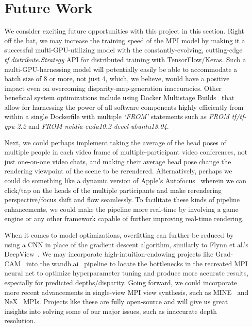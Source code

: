 \section{Future Work}\label{sec:future-work}

We consider exciting future opportunities with this project in this section. Right off the bat, we may increase the training speed of the MPI model by making it a successful multi-GPU-utilizing model with the constantly-evolving, cutting-edge \textit{tf.distribute.Strategy} API for distributed training with TensorFlow/Keras. Such a multi-GPU-harnessing model will potentially easily be able to accommodate a batch size of 8 or more, not just 4, which, we believe, would have a positive impact even on overcoming disparity-map-generation inaccuracies. Other beneficial system optimizations include using Docker Multistage Builds~\cite{noauthor_advanced_2020} that allow for harnessing the power of all software components highly efficiently from within a single Dockerfile with multiple \textit{`FROM'} statements such as \textit{FROM tf/tf-gpu-2.2} and \textit{FROM nvidia-cuda10.2-devel-ubuntu18.04}.

Next, we could perhaps implement taking the average of the head poses of multiple people in each video frame of multiple-participant video conferences, not just one-on-one video chats, and making their average head pose change the rendering viewpoint of the scene to be rerendered. Alternatively, perhaps we could do something like a dynamic version of Apple's Autofocus~\cite{noauthor_avcapturedevicefocusmodeautofocus_nodate} wherein we can click/tap on the heads of the multiple participants and make rerendering perspective/focus shift and flow seamlessly. To facilitate these kinds of pipeline enhancements, we could make the pipeline more real-time by involving a game engine or any other framework capable of further improving real-time rendering.

When it comes to model optimizations, overfitting can further be reduced by using a CNN in place of the gradient descent algorithm, similarly to Flynn et al.'s DeepView~\cite{flynn_deepview_2019}. We may incorporate high-intuition-endowing projects like Grad-CAM~\cite{selvaraju_grad-cam_2020} into the wandb.ai~\cite{wandb} pipeline to locate the bottlenecks in the recreated MPI neural net to optimize hyperparameter tuning and produce more accurate results, especially for predicted depths/disparity. Going forward, we could incorporate more recent advancements in single-view MPI view synthesis, such as MINE~\cite{li_mine_2021} and NeX~\cite{wizadwongsa_nex_2021} MPIs. Projects like these are fully open-source and will give us great insights into solving some of our major issues, such as inaccurate depth resolution. 
	
